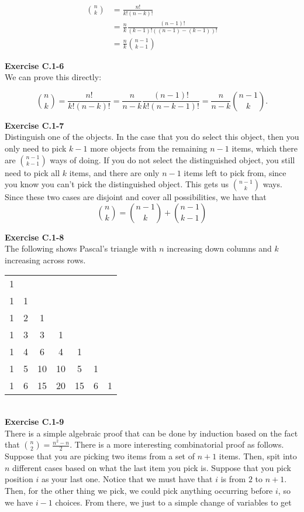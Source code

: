 \documentclass{article}
\begin{document}
\begin{align*}
\binom{n}{k} &= \frac{n!}{k!(n-k)!}\\
&= \frac{n}{k} \frac{(n-1)!}{(k-1)!((n-1)-(k-1))!}\\
&= \frac{n}{k} \binom{n-1}{k-1}
\end{align*}

\noindent\textbf{Exercise C.1-6}\\

We can prove this directly:

\[ {n \choose k} = \frac{n!}{k!(n-k)!} = \frac{n}{n-k}\frac{(n-1)!}{k!(n-k-1)!} = \frac{n}{n-k} {n-1 \choose k}.\]

\noindent\textbf{Exercise C.1-7}\\

Distinguish one of the objects. In the case that you do select this object, then you only need to pick $k-1$ more objects from the remaining $n-1$ items, which there are $\binom{n-1}{k-1}$ ways of doing. If you do not select the distinguished object, you still need to pick all $k$ items, and there are only $n-1$ items left to pick from, since you know you can't pick the distinguished object. This gets us $\binom{n-1}{k}$ ways. Since these two cases are disjoint and cover all possibilities, we have that 
\[
\binom{n}{k} = \binom{n-1}{k} + \binom{n-1}{k-1}
\]

\noindent\textbf{Exercise C.1-8}\\

The following shows Pascal's triangle with $n$ increasing down columns and $k$ increasing across rows. \\

\begin{tabular}{ccccccc}
1 &&&&&& \\
1 & 1 &&&&& \\
1 & 2 & 1 &&&& \\
1 & 3 & 3 & 1 &&& \\
1 & 4 & 6 & 4 & 1 &&\\
1 & 5  & 10 & 10 & 5 & 1 &\\
1 & 6 & 15 & 20 & 15 & 6 & 1
\end{tabular}\\

\noindent\textbf{Exercise C.1-9}\\

There is a simple algebraic proof that can be done by induction based on the fact that $\binom{n}{2} = \frac{n^2-n}{2}$. There is a more interesting combinatorial proof as follows. Suppose that you are picking two items from a set of $n+1$ items. Then, spit into $n$ different cases based on what the last item you pick is. Suppose that you pick position $i$ as your last one. Notice that we must have that $i$ is from $2$ to $n+1$. Then, for the other thing we pick, we could pick anything occurring before $i$, so we have $i-1$ choices. From there, we just to a simple change of variables to get
\end{document}
